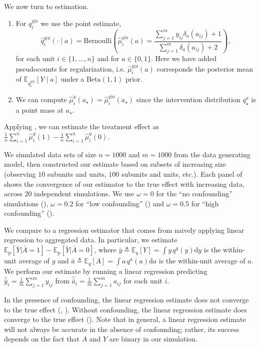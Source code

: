 \documentclass[12pt]{article}
\newcommand{\di}{\mathrm{d}}
\newcommand{\pr}{\mathrm{p}}
\begin{document}
We now turn to estimation. 
\begin{enumerate}[leftmargin=*]
	\item 
For $q^{y | a}_i$ we use the point estimate,
\begin{equation} \label{eqn:QYA_estimate}
        \hat{q}^{y|a}_i(\cdot \mid a) = \mathrm{Bernoulli}\left(\hat{\mu}^{y|a}_i(a) = \frac{\sum_{j=1}^m y_{ij} \delta_{a}(a_{ij}) +1 }{\sum_{j=1}^m \delta_{a}(a_{ij}) + 2}\right),
\end{equation}
for each unit $i \in \{1, \ldots, n\}$ and for $a \in \{0, 1\}$.
Here we have added pseudocounts for regularization, i.e. $\hat{\mu}^{y|a}_i(a)$ corresponds the posterior mean of $\mathbb{E}_{q^{y|a}_i}[Y \mid a]$ under a $\mathrm{Beta}(1, 1)$ prior. 
\item We can compute $\hat{\mu}_i^y(a_\star) = \hat{\mu}^{y|a}_i(a_\star)$ since the intervention distribution $q_\star^a$ is a point mass at $a_\star$.
\end{enumerate}
Applying , we can estimate the treatment effect as
$\frac{1}{n} \sum_{i=1}^n \hat{\mu}^{y}_i(1) - \frac{1}{n} \sum_{i=1}^n \hat{\mu}^{y}_i(0).$


We simulated data sets of size $n = 1000$ and $m = 1000$ from the data generating model, then constructed our estimate based on subsets of increasing size (observing $10$ subunits and units, $100$ subunits and units, etc.).
Each panel of  shows the convergence of our estimator to the true effect with increasing data, across 20 independent simulations.
We use $\omega=0$ for the ``no confounding'' simulations (), $\omega=0.2$ for ``low confounding'' () and $\omega=0.5$ for ``high confounding'' ().

We compare to a regression estimator that comes from naively applying linear regression to aggregated data. In particular, we estimate $\mathbb{E}_{\pr}[\bar{Y} | \bar{A}=1] - \mathbb{E}_{\pr}[\bar{Y} | \bar{A}=0]$, where $\bar{y} \triangleq \mathbb{E}_{q}[Y] = \int y\, q^y(y) \di y$ is the within-unit average of $y$ and $\bar{a} \triangleq \mathbb{E}_{q}[A] = \int a\, q^a(a) \di a$ is the within-unit average of $a$.
We perform our estimate by running a linear regression predicting $\hat{\bar{y}}_i = \frac{1}{m} \sum_{j=1}^m y_{ij}$ from $\hat{\bar{a}}_i = \frac{1}{m} \sum_{j=1}^m a_{ij}$ for each unit $i$. 

In the presence of confounding, the linear regression estimate does not converge to the true effect (, ).
Without confounding, the linear regression estimate does converge to the true effect ().
Note that in general, a linear regression estimate will not always be accurate in the absence of confounding; rather, its success depends on the fact that $A$ and $Y$ are binary in our simulation. 
\end{document}
